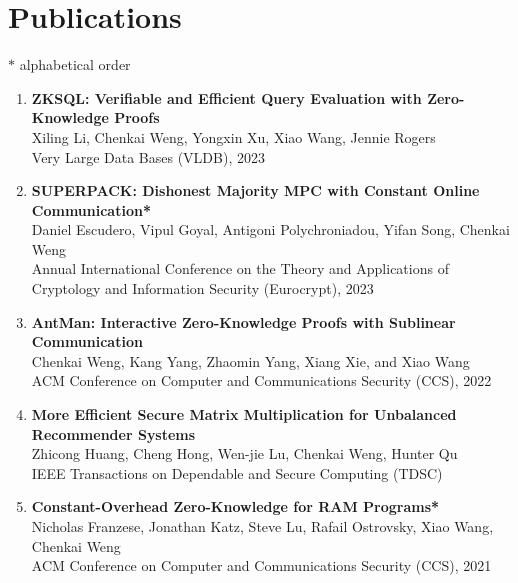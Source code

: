 \documentclass[letterpaper,11pt]{article}
\newcommand{\resumeSubHeadingListStart}{\begin{itemize}[leftmargin=0.15in, label={}]}
\begin{document}
\section{Publications}
{\small $*$ alphabetical order}
\begin{enumerate}[leftmargin=0.20in]
  \item
          {\textbf{\small ZKSQL: Verifiable and Efficient Query Evaluation with Zero-Knowledge Proofs}} \\
		{\small Xiling Li, Chenkai Weng, Yongxin Xu, Xiao Wang, Jennie Rogers \vspace{-2pt}} \\
        {\small Very Large Data Bases (VLDB), 2023}
  \item
          {\textbf{\small SUPERPACK: Dishonest Majority MPC with Constant Online Communication*}} \\
		{\small Daniel Escudero, Vipul Goyal, Antigoni Polychroniadou, Yifan Song, Chenkai Weng \vspace{-2pt}} \\
        {\small Annual International Conference on the Theory and Applications of Cryptology and Information Security (Eurocrypt), 2023}
  \item
          {\textbf{\small AntMan: Interactive Zero-Knowledge Proofs with Sublinear Communication}} \\
		{\small Chenkai Weng, Kang Yang, Zhaomin Yang, Xiang Xie, and Xiao Wang \vspace{-2pt}} \\
		{\small ACM Conference on Computer and Communications Security (CCS), 2022}
  \item
          {\textbf{\small More Efficient Secure Matrix Multiplication for Unbalanced Recommender Systems}} \\
		{\small Zhicong Huang, Cheng Hong, Wen-jie Lu, Chenkai Weng, Hunter Qu \vspace{-2pt}} \\
		{\small IEEE Transactions on Dependable and Secure Computing (TDSC)}
  \item
          {\textbf{\small Constant-Overhead Zero-Knowledge for RAM Programs*}} \\
		{\small Nicholas Franzese, Jonathan Katz, Steve Lu, Rafail Ostrovsky, Xiao Wang, Chenkai Weng \vspace{-2pt}} \\
		{\small ACM Conference on Computer and Communications Security (CCS), 2021}

\end{enumerate}
\end{document}
